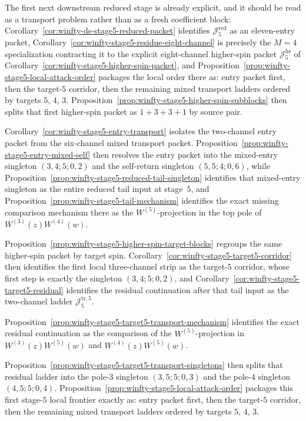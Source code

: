 \begin{remark}
The first next downstream reduced stage is already explicit, and it
should be read as a transport problem rather than as a fresh
coefficient block:
Corollary~\ref{cor:winfty-ds-stage5-reduced-packet} identifies
$\mathcal{J}_5^{\mathrm{red}}$ as an eleven-entry packet,
Corollary~\ref{cor:winfty-stage5-residue-eight-channel} is precisely
the $M=4$ specialization contracting it to the explicit eight-channel
higher-spin packet
$\mathcal{J}_5^{\mathrm{hs}}$ of
Corollary~\ref{cor:winfty-stage5-higher-spin-packet}, and
Proposition~\ref{prop:winfty-stage5-local-attack-order} packages the
local order there as: entry packet first, then the target-$5$
corridor, then the remaining mixed transport ladders ordered by
targets $5$, $4$, $3$.
Proposition~\ref{prop:winfty-stage5-higher-spin-subblocks} then splits
that first higher-spin packet as $1+3+3+1$ by source pair.

Corollary~\ref{cor:winfty-stage5-entry-transport} isolates the
two-channel entry packet from the six-channel mixed transport packet.
Proposition~\ref{prop:winfty-stage5-entry-mixed-self} then resolves the
entry packet into the mixed-entry singleton $(3,4;5;0,2)$ and the
self-return singleton $(5,5;4;0,6)$, while
Proposition~\ref{prop:winfty-stage5-reduced-tail-singleton} identifies
that mixed-entry singleton as the entire reduced tail input at stage~$5$,
and Proposition~\ref{prop:winfty-stage5-tail-mechanism} identifies the
exact missing comparison mechanism there as the $W^{(5)}$-projection in
the top pole of $W^{(3)}(z)W^{(4)}(w)$.

Proposition~\ref{prop:winfty-stage5-higher-spin-target-blocks}
regroups the same higher-spin packet by target spin.
Corollary~\ref{cor:winfty-stage5-target5-corridor} then identifies the
first local three-channel strip as the target-$5$ corridor, whose first
step is exactly the singleton $(3,4;5;0,2)$, and
Corollary~\ref{cor:winfty-stage5-target5-residual} identifies the
residual continuation after that tail input as the two-channel ladder
$\mathcal{J}_5^{\mathrm{tr},5}$.

Proposition~\ref{prop:winfty-stage5-target5-transport-mechanism}
identifies the exact residual continuation as the comparison of the
$W^{(5)}$-projection in $W^{(3)}(z)W^{(5)}(w)$ and
$W^{(4)}(z)W^{(5)}(w)$.

Proposition~\ref{prop:winfty-stage5-target5-transport-singletons}
then splits that residual ladder into the pole-$3$ singleton
$(3,5;5;0,3)$ and the pole-$4$ singleton $(4,5;5;0,4)$.
Proposition~\ref{prop:winfty-stage5-local-attack-order} packages this
first stage-$5$ local frontier exactly as: entry packet first, then the
target-$5$ corridor, then the remaining mixed transport ladders ordered
by targets $5$, $4$, $3$.


\end{remark}
